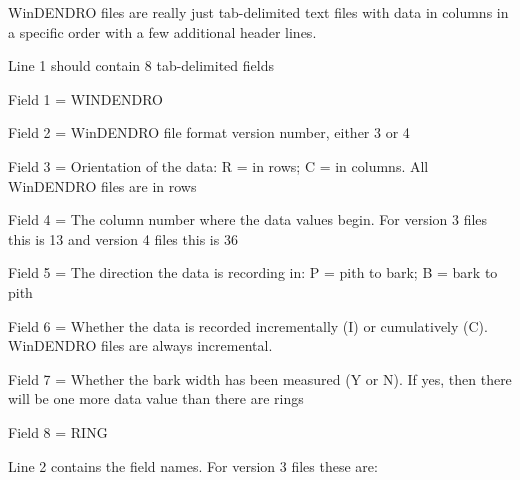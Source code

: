 WinDENDRO files are really just tab-delimited text files with data in columns in a specific order with a few additional header lines.

Line 1 should contain 8 tab-delimited fields 

\begin{itemize*}
 \item Field 1 = WINDENDRO
 \item  Field 2 = WinDENDRO file format version number, either 3 or 4
 \item  Field 3 = Orientation of the data: R = in rows; C = in columns. All WinDENDRO files are in rows
 \item  Field 4 = The column number where the data values begin. For version 3 files this is 13 and version 4 files this is 36
 \item  Field 5 = The direction the data is recording in: P = pith to bark; B = bark to pith
 \item  Field 6 = Whether the data is recorded incrementally (I) or cumulatively (C). WinDENDRO files are always incremental.
 \item  Field 7 = Whether the bark width has been measured (Y or N). If yes, then there will be one more data value than there are rings
 \item  Field 8 = RING 
\end{itemize*}

Line 2 contains the field names.  For version 3 files these are:

